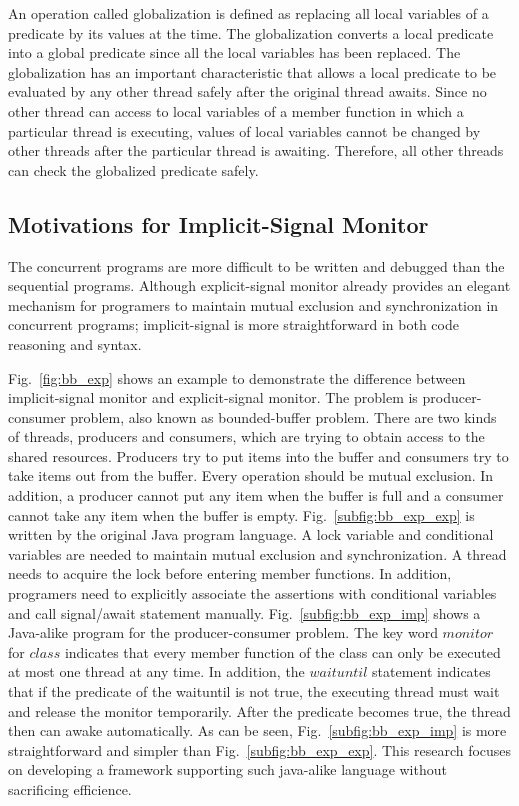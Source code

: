 \documentclass[preprint]{sigplanconf}
\begin{document}
An operation called globalization is defined as replacing all local variables of
a predicate by its values at the time. The globalization converts a local 
predicate into a global predicate since all the local variables has been 
replaced. The globalization has an important characteristic that allows a
local predicate to be evaluated by any other thread safely after the original
thread awaits. Since no other thread can access to local variables of a member 
function in which a particular thread is executing, values of local variables 
cannot be changed by other threads after the particular thread is awaiting. 
Therefore, all other threads can check the globalized predicate safely. 


\subsection{Motivations for Implicit-Signal Monitor}
The concurrent programs are more difficult to be written and debugged than the 
sequential programs. Although explicit-signal monitor already provides an 
elegant mechanism for programers to maintain mutual exclusion and synchronization 
in concurrent programs; implicit-signal is more straightforward in both code
reasoning and syntax. 

Fig.~\ref{fig:bb_exp} shows an example to
demonstrate the difference between implicit-signal monitor and explicit-signal 
monitor. The problem is producer-consumer problem, also known as bounded-buffer
problem. There are two kinds of threads, producers and consumers, which are 
trying to obtain access to the shared resources. Producers try to put items 
into the buffer and consumers try to take items out from the buffer. Every 
operation should be mutual exclusion. In addition, a producer cannot put any 
item when the buffer is full and a consumer cannot take any item when the 
buffer is empty. Fig.~\ref{subfig:bb_exp_exp} is written by the original Java
program language. A lock variable and conditional variables are
needed to maintain mutual exclusion and synchronization. A thread needs to
acquire the lock before entering member functions. In addition, programers need
to explicitly associate the assertions with conditional variables and call
signal/await statement manually. Fig.~\ref{subfig:bb_exp_imp} shows a Java-alike
program for the producer-consumer problem. The key word $monitor$ for $class$
indicates that every member function of the class can only be executed at most
one thread at any time. In addition, the $waituntil$ statement indicates that if
the predicate of the waituntil is not true, the executing thread must wait and
release the monitor temporarily. After the predicate becomes true, the thread
then can awake automatically. As can be seen, Fig.~\ref{subfig:bb_exp_imp} is
more straightforward and simpler than Fig.~\ref{subfig:bb_exp_exp}. This research
focuses on developing a framework supporting such java-alike language without 
sacrificing efficience.
\end{document}
